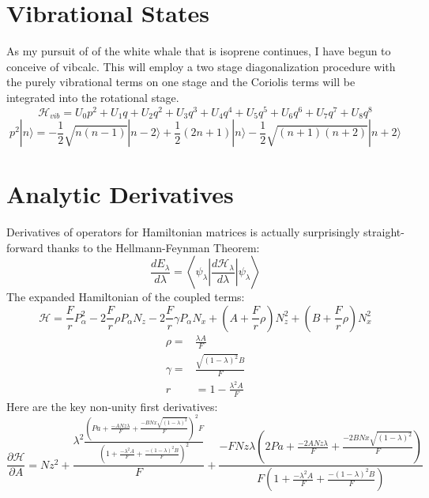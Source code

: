 \documentclass{article}
\begin{document}
\section{Vibrational States}
As my pursuit of of the white whale that is isoprene continues, I have begun to conceive of vibcalc. This will employ a two stage diagonalization procedure with the purely vibrational terms on one stage and the Coriolis terms will be integrated into the rotational stage.
\begin{equation}
\mathscr{H}_{vib} = U_{0}p^{2} + U_{1}q + U_{2}q^{2} + U_{3}q^{3} + U_{4}q^{4} + U_{5}q^{5} + U_{6}q^{6} + U_{7}q^{7} + U_{8}q^{8}
\end{equation}
\begin{equation}
	p^{2}|n\rangle = -\frac{1}{2}\sqrt{n(n-1)}|n-2\rangle + \frac{1}{2}(2n+1)|n\rangle - \frac{1}{2}\sqrt{(n+1)(n+2)}|n+2\rangle 
\end{equation}


\section{Analytic Derivatives}
Derivatives of operators for Hamiltonian matrices is actually surprisingly straight-forward thanks to the Hellmann-Feynman Theorem:
\begin{equation}
\frac{d E_{\lambda}}{d\lambda} = \left\langle \psi_{\lambda} \left|\frac{d\mathscr{H}_{\lambda}}{d\lambda}\right|\psi_{\lambda} \right\rangle
\end{equation}
The expanded Hamiltonian of the coupled terms:
\begin{equation}
	\mathscr{H} = \frac{F}{r}P_{\alpha}^{2} - 2\frac{F}{r}\rho P_{\alpha}N_{z} - 2\frac{F}{r}\gamma P_{\alpha}N_{x} + (A+\frac{F}{r}\rho)N_{z}^{2} + (B+\frac{F}{r}\rho)N_{x}^{2}
\end{equation}
\begin{align}
	\rho =& \frac{\lambda A}{F} \\
	\gamma =& \frac{\sqrt{(1-\lambda)^{2}} B}{F} \\
	r &= 1 - \frac{\lambda^{2} A}{F} 
\end{align}
Here are the key non-unity first derivatives:
\begin{equation}
	\frac{\partial \mathscr{H}}{\partial A} =
		Nz^{2} + \frac{\lambda^{2} \frac{\left( Pa + \frac{ - A Nz \lambda}{F} + \frac{ - B Nx \sqrt{\left( 1 - \lambda \right)^{2}}}{F} \right)^{2} F}{\left( 1 + \frac{ - \lambda^{2} A}{F} + \frac{ - \left( 1 - \lambda \right)^{2} B}{F} \right)^{2}}}{F} + \frac{ - F Nz \lambda \left( 2 Pa + \frac{ - 2 A Nz \lambda}{F} + \frac{ - 2 B Nx \sqrt{\left( 1 - \lambda \right)^{2}}}{F} \right)}{F \left( 1 + \frac{ - \lambda^{2} A}{F} + \frac{ - \left( 1 - \lambda \right)^{2} B}{F} \right)}
\end{equation}
\end{document}
